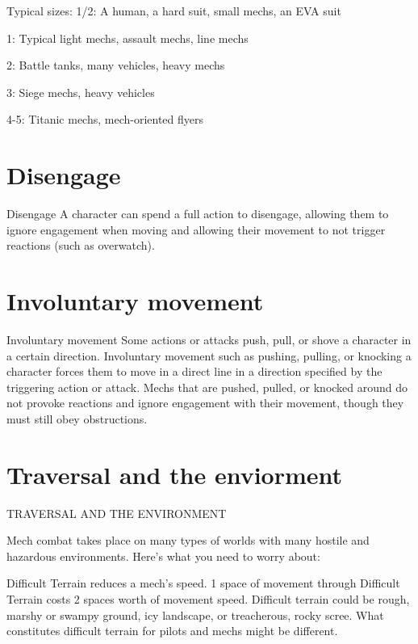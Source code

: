 Typical sizes:  
1/2: A human, a hard suit, small mechs, an EVA suit
 
1: Typical light mechs, assault mechs, line mechs
 
2: Battle tanks, many vehicles, heavy mechs
 
3: Siege mechs, heavy vehicles
 
4-5: Titanic mechs, mech-oriented flyers
 
\section{Disengage}
                                               Disengage  
A character can spend a full action to disengage, allowing them to ignore engagement when  
moving and allowing their movement to not trigger reactions (such as overwatch).  
\section{Involuntary movement}
                                      Involuntary movement  
Some actions or attacks push, pull, or shove a character in a certain direction. Involuntary  
movement such as pushing, pulling, or knocking a character forces them to move in a direct line  
in a direction specified by the triggering action or attack. Mechs that are pushed, pulled, or  
knocked around do not provoke reactions and ignore engagement with their movement, though  
they must still obey obstructions.  
                                                        
 
\section{Traversal and the enviorment}
                          TRAVERSAL AND THE ENVIRONMENT  

Mech combat takes place on many types of worlds with many hostile and hazardous  
environments. Here’s what you need to worry about:
 

                                                                                                             


Difficult Terrain reduces a mech’s speed. 1 space of movement through Difficult Terrain costs 2  
spaces worth of movement speed. Difficult terrain could be rough, marshy or swampy ground,  
icy landscape, or treacherous, rocky scree. What constitutes difficult terrain for pilots and mechs  
might be different.
 

